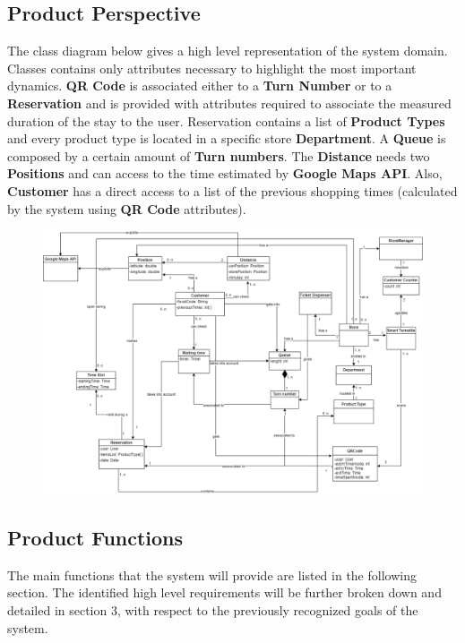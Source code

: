 \documentclass{article}
\begin{document}
\subsection{Product Perspective}
The class diagram below gives a high level representation of the system domain. Classes contains only attributes necessary to highlight the most important dynamics. \textbf{QR Code} is associated either to a \textbf{Turn Number} or to a \textbf{Reservation} and is provided with attributes required to associate the measured duration of the stay to the user. Reservation contains a list of \textbf{Product Types} and every product type is located in a specific store \textbf{Department}. A \textbf{Queue} is composed by a certain amount of \textbf{Turn numbers}. The \textbf{Distance} needs two \textbf{Positions} and can access to the time estimated by \textbf{Google Maps API}. Also, \textbf{Customer} has a direct access to a list of the previous shopping times (calculated by the system using \textbf{QR Code} attributes).
\begin{figure}[]
  \includegraphics[width=\linewidth]{class_diagram.png}
  
\end{figure}

\subsection{Product Functions}
The main functions that the system will provide are listed in the following section. The identified high level requirements will be further broken down and detailed in section 3, with respect to the previously recognized goals of the system.
\end{document}
